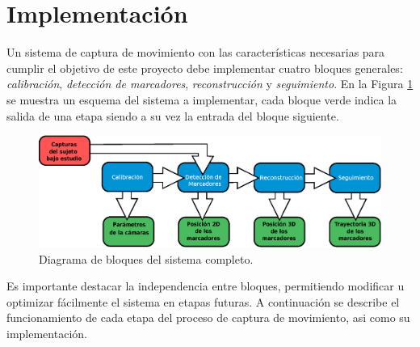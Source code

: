 \section{Implementación}\label{implementacionPosta}
Un sistema de captura de movimiento con las características necesarias para cumplir el objetivo de este proyecto debe implementar cuatro bloques generales: \emph{calibración}, \emph{detección de marcadores}, \emph{reconstrucción} y \emph{seguimiento}. En la Figura \ref{bloquesSist} se muestra un esquema del sistema a implementar, cada bloque verde indica la salida de una etapa siendo  a su vez la entrada del bloque siguiente.
\begin{figure}[ht!]
	\centering
	\hspace{-0.5cm}
	\includegraphics[scale=0.55]{imagenes/Sistema_completo/Diagrama_de_bloques.eps}
	\caption{Diagrama de bloques del sistema completo.}
	\label{bloquesSist}
\end{figure}

Es importante destacar la independencia entre bloques, permitiendo modificar u optimizar fácilmente el sistema en etapas futuras.
A continuación se describe el funcionamiento de cada etapa del proceso de captura de movimiento, asi como su implementación.



